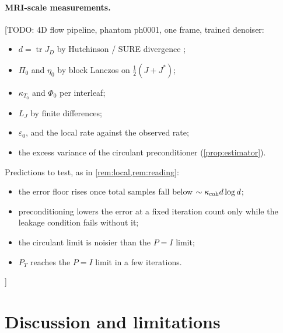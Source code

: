 \documentclass[11pt]{article}
\theoremstyle{definition}
\theoremstyle{remark}
\newcommand{\tr}{\operatorname{tr}}
\newcommand{\todo}[1]{\textcolor{blue!70!black}{[TODO: #1]}}
\begin{document}
\paragraph{MRI-scale measurements.} \todo{4D flow pipeline, phantom ph0001, one frame, trained denoiser:
\begin{itemize}
\item $d=\tr J_D$ by Hutchinson / SURE divergence \cite{hutchinson1989,stein1981};
\item $\Pi_0$ and $\eta_0$ by block Lanczos on $\tfrac12(J+J^*)$;
\item $\kappa_{T_0}$ and $\Phi_0$ per interleaf;
\item $L_J$ by finite differences;
\item $\varepsilon_0$, and the local rate against the observed rate;
\item the excess variance of the circulant preconditioner (\cref{prop:estimator}).
\end{itemize}
Predictions to test, as in \cref{rem:local,rem:reading}:
\begin{itemize}
\item the error floor rises once total samples fall below $\sim\kappa_{\rm coh}d\log d$;
\item preconditioning lowers the error at a fixed iteration count only while the leakage condition fails without
  it;
\item the circulant limit is noisier than the $P=I$ limit;
\item $P_T$ reaches the $P=I$ limit in a few iterations.
\end{itemize}}

\section{Discussion and limitations}\label{sec:discussion}
\end{document}

